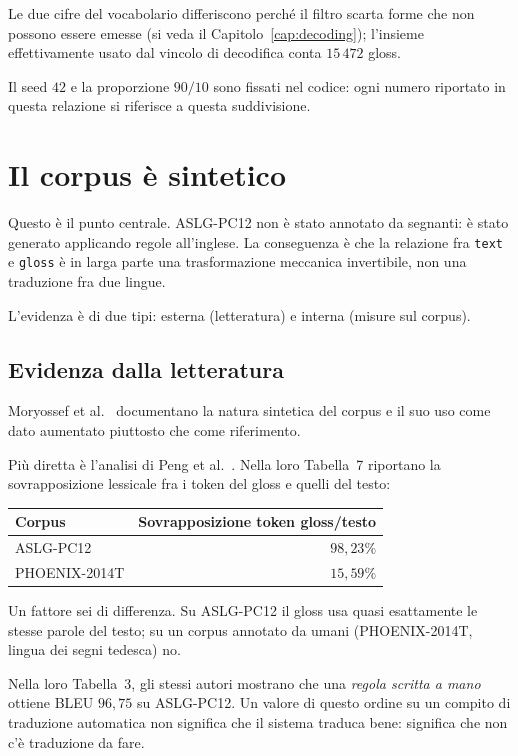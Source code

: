 Le due cifre del vocabolario differiscono perché il filtro scarta forme che non
possono essere emesse (si veda il Capitolo~\ref{cap:decoding}); l'insieme
effettivamente usato dal vincolo di decodifica conta $15\,472$ gloss.

Il seed $42$ e la proporzione $90/10$ sono fissati nel codice: ogni numero
riportato in questa relazione si riferisce a questa suddivisione.

\section{Il corpus è sintetico}
\label{sec:sintetico}

Questo è il punto centrale. ASLG-PC12 non è stato annotato da segnanti: è stato
generato applicando regole all'inglese. La conseguenza è che la relazione fra
\texttt{text} e \texttt{gloss} è in larga parte una trasformazione meccanica
invertibile, non una traduzione fra due lingue.

L'evidenza è di due tipi: esterna (letteratura) e interna (misure sul corpus).

\subsection{Evidenza dalla letteratura}

Moryossef et al.~\cite{moryossef2021augmentation} documentano la natura
sintetica del corpus e il suo uso come dato aumentato piuttosto che come
riferimento.

Più diretta è l'analisi di Peng et al.~\cite{peng2023monolingual}. Nella loro
Tabella~7 riportano la sovrapposizione lessicale fra i token del gloss e quelli
del testo:

\begin{center}
\begin{tabular}{lr}
\toprule
Corpus & Sovrapposizione token gloss/testo \\
\midrule
ASLG-PC12 & $98{,}23\%$ \\
PHOENIX-2014T & $15{,}59\%$ \\
\bottomrule
\end{tabular}
\end{center}

Un fattore sei di differenza. Su ASLG-PC12 il gloss usa quasi esattamente le
stesse parole del testo; su un corpus annotato da umani (PHOENIX-2014T, lingua
dei segni tedesca) no.

Nella loro Tabella~3, gli stessi autori mostrano che una \emph{regola scritta a
mano} ottiene BLEU $96{,}75$ su ASLG-PC12. Un valore di questo ordine su un
compito di traduzione automatica non significa che il sistema traduca bene:
significa che non c'è traduzione da fare.

